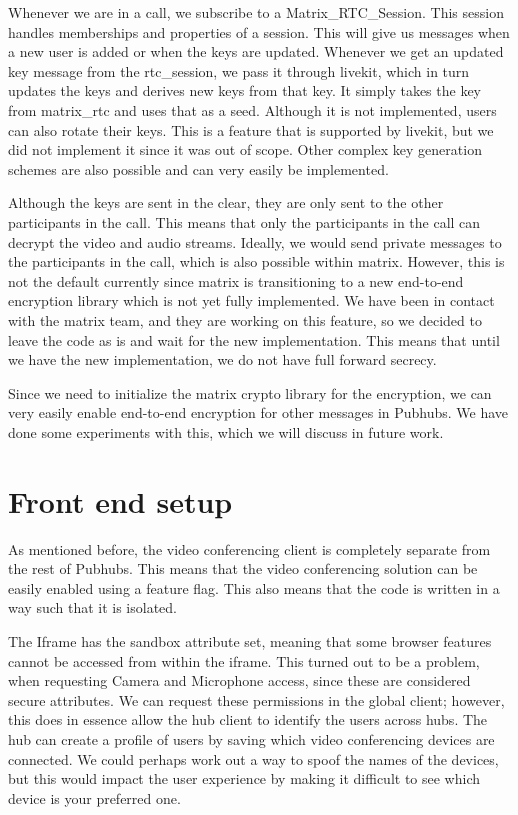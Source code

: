 \documentclass{report}
\begin{document}
Whenever we are in a call, we subscribe to a Matrix\_RTC\_Session. This session handles memberships and
properties of a session. This will give us messages when a new user is added or when the keys are updated.
Whenever we get an updated key message from the rtc\_session, we pass it through livekit, which in turn updates
the keys and derives new keys from that key. It simply takes the key from matrix\_rtc and uses
that as a seed. Although it is not implemented, users can also rotate their keys. This is a feature that is
supported by livekit, but we did not implement it since it was out of scope. Other complex key generation schemes
are also possible and can very easily be implemented.

Although the keys are sent in the clear, they are only sent to the other participants in the call. This means that
only the participants in the call can decrypt the video and audio streams. Ideally, we would send private
messages to the participants in the call, which is also possible within matrix. However, this is not the default
currently since matrix is transitioning to a new end-to-end encryption library which is not yet fully implemented.
We have been in contact with the matrix team, and they are working on this feature, so we decided to leave the code
as is and wait for the new implementation. This means that until we have the new implementation, we do not have
full forward secrecy.

Since we need to initialize the matrix crypto library for the encryption, we can very easily enable end-to-end
encryption for other messages in Pubhubs. We have done some experiments with this, which we will discuss in future
work.


\section{Front end setup}
As mentioned before, the video conferencing client is completely separate from the rest of Pubhubs. This means that
the video conferencing solution can be easily enabled using a feature flag. This also means that the code is
written in a way such that it is isolated.

The Iframe has the sandbox attribute set, meaning that some browser features cannot be accessed from within the
iframe. This turned out to be a problem, when requesting Camera and Microphone access, since these are considered
secure attributes. We can request these permissions in the global client; however, this does in essence allow the
hub client to identify the users across hubs. The hub can create a profile of users by saving which video
conferencing devices are connected. We could perhaps work out a way to spoof the names of the devices, but this
would impact the user experience by making it difficult to see which device is your preferred one.
\end{document}
